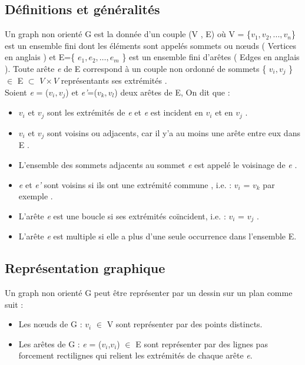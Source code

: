 	\subsection{Définitions et généralités}
		
Un graph non orienté G est la donnée d’un couple (V , E) où V = \{$ \textit{v}_{1} , \textit{v}_{2} ,..., \textit{v}_{n} $\} est un ensemble fini dont les éléments sont appelés sommets ou nœuds ( Vertices en anglais ) et E=\{ $\textit{e}_{1} ,  \textit{e}_{2} ,…, \textit{e}_{m} $  \} est un ensemble fini d'arêtes ( Edges en anglais ). Toute arête \textit{e} de E correspond à un couple non ordonné de sommets \{ $\textit{v}_{i} , \textit{v}_{j}$ \} $\in$ E $\subset$  $V \times V$ représentants ses extrémités \citep{muller} \citep{fages2014exploitation}.
\\Soient \textit{e} = ($\textit{v}_{i} , \textit{v}_{j}$) et \textit{e'}=($\textit{v}_{k} , \textit{v}_{l}$) deux arêtes de E, On dit que :
\begin{itemize}
\item $\textit{v}_{i}$ et $\textit{v}_{j}$ sont les extrémités de  \textit{e} et \textit{e} est incident en $\textit{v}_{i}$ et en  $\textit{v}_{j}$ \citep{hennecart2012elements}.
\item $\textit{v}_{i}$ et $\textit{v}_{j}$ sont voisins ou adjacents, car il y’a au moins une arête entre eux dans E \citep{IUTLyonInformatique}.
\item L'ensemble des sommets adjacents au sommet \textit{e} est appelé le voisinage de \textit{e} \citep{muller}. 
\item \textit{e} et \textit{e'} sont voisins si ils ont une extrémité commune , i.e. : $\textit{v}_{i}$ = $\textit{v}_{k}$ par exemple \citep{lopez2003cours}.
\item L’arête \textit{e} est une boucle si ses extrémités coïncident, i.e. : $\textit{v}_{i}$ = $\textit{v}_{j}$ \citep{IUTLyonInformatique}. 
\item L’arête \textit{e} est multiple si elle a plus d’une seule occurrence dans l'ensemble E.
\end{itemize}	
		 
		\subsection{Représentation graphique}
		Un graph non orienté G peut être représenter par un dessin sur un plan comme suit \citep{muller}:
		\begin{itemize}

\item Les nœuds de G : $\textit{v}_{i}$ $\in$ V sont représenter par des points distincts.
\item 	Les arêtes de G : \textit{e} = ($\textit{v}_{i}$,$\textit{v}_{i}$) $\in$ E sont représenter par des lignes pas forcement rectilignes qui relient les extrémités de chaque arête \textit{e}.
\end{itemize}


